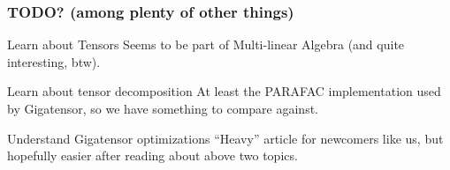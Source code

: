 \begin{frame}[plain]
	\frametitle{TODO? (among plenty of other things)}
	\begin{block}{Learn about Tensors}
    Seems to be part of Multi-linear Algebra (and quite interesting,
    btw). 
	\end{block}
	\begin{block}{Learn about tensor decomposition}
    At least the PARAFAC implementation used by Gigatensor, so we have
    something to compare against.
	\end{block}
	\begin{block}{Understand Gigatensor optimizations}
    ``Heavy'' article for newcomers like us, but hopefully easier
    after reading about above two topics.
	\end{block}
\end{frame}
